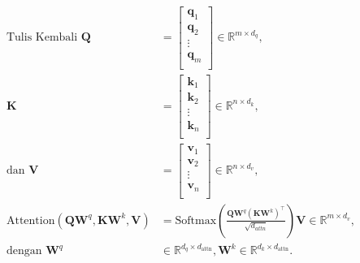 	\begin{align}
	\label{equ:scaled-dot-product-attention-matrix-start}
	\text{Tulis Kembali } \mathbf{Q} &= \begin{bmatrix}
		\mathbf{q}_1 \\
		\mathbf{q}_2 \\
		\vdots \\
		\mathbf{q}_m \\
	\end{bmatrix} \in \mathbb{R}^{m \times d_{q}}, \\
	\mathbf{K} &= \begin{bmatrix}
		\mathbf{k}_1 \\
		\mathbf{k}_2 \\
		\vdots \\
		\mathbf{k}_n \\
	\end{bmatrix} \in \mathbb{R}^{n \times d_{k}}, \\
	\text{dan } \mathbf{V} &= \begin{bmatrix}
		\mathbf{v}_1 \\
		\mathbf{v}_2 \\
		\vdots \\
		\mathbf{v}_n \\
	\end{bmatrix} \in \mathbb{R}^{n \times d_{v}}, \\
	\label{equ:scaled-dot-product-attention-matrix-end}
	\text{Attention}(\mathbf{QW}^q, \mathbf{KW}^k, \mathbf{V}) &= \text{Softmax}( \frac{\mathbf{QW}^q (\mathbf{KW}^k)^{\top}}{\sqrt{d_{attn}}}) \mathbf{V} \in \mathbb{R}^{m \times d_{v}}, \\
	\text{dengan } \mathbf{W}^q &\in \mathbb{R}^{d_q \times d_{\text{attn}}}, \mathbf{W}^k \in \mathbb{R}^{d_k \times d_{\text{attn}}}.
	\end{align}

